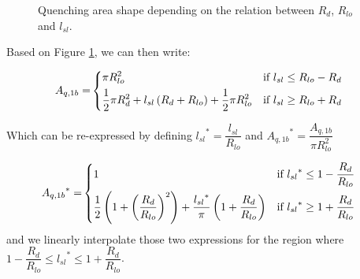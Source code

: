 \begin{figure}[!h]
\centering
{}
\hfill
{}
\hfill
{}
\caption{Quenching area shape depending on the relation between $R_{d}$, $R_{lo}$ and $l_{sl}$.}
\label{fig:slide_area}
\end{figure}

\npar

Based on Figure \ref{fig:slide_area}, we can then write:

\begin{align}
A_{q,1b} = &
\begin{dcases}
\pi R_{lo}^{2} & \text{if } l_{sl}\leq R_{lo}-R_{d} \\
%
\frac{1}{2}\pi R_{d}^{2} + l_{sl}\parth{R_{d}+R_{lo}} + \frac{1}{2}\pi R_{lo}^{2} & \text{if } l_{sl} \geq R_{lo}+R_{d}
%
\end{dcases}
\label{eq:Aq_1b}
\end{align}

Which can be re-expressed by defining ${l_{sl}}^{*}=\dfrac{l_{sl}}{R_{lo}}$ and ${A_{q,1b}}^{*}=\dfrac{A_{q,1b}}{\pi R_{lo}^{2}}$

\begin{align}
{A_{q,1b}}^{*} = &
\begin{dcases}
1 & \text{if } {l_{sl}}^{*}\leq 1- \frac{R_{d}}{R_{lo}} \\
%
\frac{1}{2}\parth{1+\parth{\frac{R_{d}}{R_{lo}}}^{2} } + \frac{{l_{sl}}^{*}}{\pi}\parth{1+\frac{R_{d}}{R_{lo}}} & \text{if } {l_{sl}}^{*} \geq 1 + \frac{R_{d}}{R_{lo}}
\end{dcases}
\label{eq:Aq_1b_star}
\end{align}
and we linearly interpolate those two expressions for the region where $1-\dfrac{R_{d}}{R_{lo}}\leq {l_{sl}}^{*} \leq 1+\dfrac{R_{d}}{R_{lo}}$.


